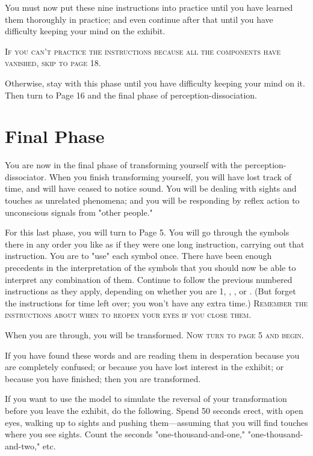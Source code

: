 You must now put these nine instructions into practice until you have 
learned them thoroughly in practice; and even continue after that until you 
have difficulty keeping your mind on the exhibit. 

\textsc{If you can't practice the instructions because all the components have vanished, skip to page 18.}

Otherwise, stay with this phase until you have difficulty keeping your 
mind on it. Then turn to Page 16 and the final phase of 
perception-dissociation. 

\clearpage
{}

\section{Final Phase}

You are now in the final phase of transforming yourself with the 
perception-dissociator. When you finish transforming yourself, you will have 
lost track of time, and will have ceased to notice sound. You will be dealing 
with sights and touches as unrelated phenomena; and you will be responding 
by reflex action to unconscious signals from "other people." 

For this last phase, you will turn to Page 5. You will go through the 
symbols there in any order you like as if they were one long instruction, 
carrying out that instruction. You are to "use" each symbol once. There 
have been enough precedents in the interpretation of the symbols that you 
should now be able to interpret any combination of them. Continue to 
follow the previous numbered instructions as they apply, depending on 
whether you are 1, , , or . 
(But forget the instructions for time left 
over; you won't have any extra time.) 
\textsc{Remember the instructions about when to reopen your eyes if you close them.}

When you are through, you will be transformed. 
\textsc{Now turn to page 5 and begin.}

\clearpage
{}

If you have found these words and are reading them in desperation 
because you are completely confused; or because you have lost interest in 
the exhibit; or because you have finished; then you are transformed. 


If you want to use the model to simulate the reversal of your 
transformation before you leave the exhibit, do the following. Spend 50 
seconds erect, with open eyes, walking up to sights and pushing 
them---assuming that you will find touches where you see sights. Count the 
seconds "one-thousand-and-one," "one-thousand-and-two," etc. 


